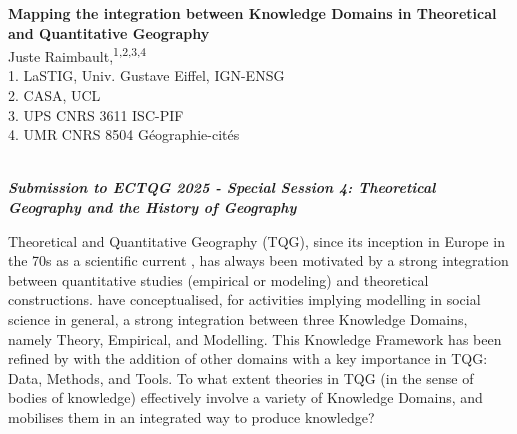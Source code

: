\documentclass[11pt]{article}
\renewcommand{\title}[1]{{\noindent\large\bfseries#1\medskip\\}}
\renewcommand{\author}[2]{{\noindent #1 \medskip\\ \small #2 \medskip\\}}
\begin{document}
\title{Mapping the integration between Knowledge Domains in Theoretical and Quantitative Geography}
\author{
Juste Raimbault,\textsuperscript{1,2,3,4}
}
{
1. LaSTIG, Univ. Gustave Eiffel, IGN-ENSG\\
2. CASA, UCL\\
3. UPS CNRS 3611 ISC-PIF\\
4. UMR CNRS 8504 G{\'e}ographie-cit{\'e}s\\
}








\vspace{-1cm}
\noindent
\textit{\textbf{Submission to ECTQG 2025 - Special Session 4: Theoretical Geography and the History of Geography}}

\vspace{1cm}

Theoretical and Quantitative Geography (TQG), since its inception in Europe in the 70s as a scientific current \cite{cuyala2015affirmation}, has always been motivated by a strong integration between quantitative studies (empirical or modeling) and theoretical constructions. \cite{livet2010ontology} have conceptualised, for activities implying modelling in social science in general, a strong integration between three Knowledge Domains, namely Theory, Empirical, and Modelling. This Knowledge Framework has been refined by \cite{raimbault2017applied} with the addition of other domains with a key importance in TQG: Data, Methods, and Tools. To what extent theories in TQG (in the sense of bodies of knowledge) effectively involve a variety of Knowledge Domains, and mobilises them in an integrated way to produce knowledge?
\end{document}
